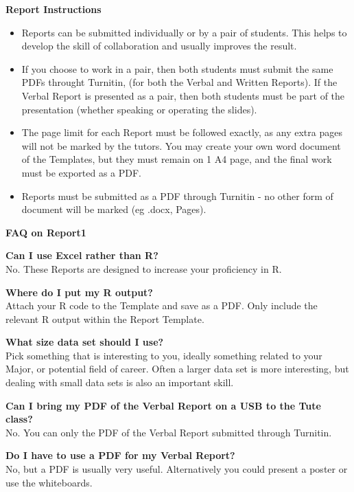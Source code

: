 \documentclass[bigtut]{quiz}\usepackage[]{graphicx}\usepackage[]{color}
\begin{document}
\begin{tutorial}
\vspace{.5cm}
{\bf Report Instructions}
\begin{itemize}
\item Reports can be submitted individually or by a pair of students. This helps to develop the skill of collaboration and usually improves the result. \\
\item If you choose to work in a pair, then both students must submit the same PDFs throught Turnitin, (for both the Verbal and Written Reports). If the Verbal Report is presented as a pair, then both students must be part of the presentation (whether speaking or operating the slides).  \\
\item The page limit for each Report must be followed exactly, as any extra pages will not be marked by the tutors. You may create your own word document of the Templates, but they must remain on 1 A4 page, and the final work must be exported as a PDF.  \\
\item Reports must be submitted as a PDF through Turnitin - no other form of document will be marked (eg .docx, Pages).
\end{itemize}


 
{\bf FAQ on Report1} 

{\bf Can I use Excel rather than R?} \\
No. These Reports are designed to increase your proficiency in R. 

{\bf Where do I put my R output?} \\
Attach your R code to the Template and save as a PDF. Only include the relevant R output within the Report Template.

{\bf What size data set should I use?} \\
Pick something that is interesting to you, ideally something related to your Major, or potential field of career.  Often a larger data set is more interesting, but dealing with small data sets is also an important skill. 

{\bf Can I bring my PDF of the Verbal Report on a USB to the Tute class?} \\
No. You can only the PDF of the Verbal Report submitted through Turnitin.

{\bf Do I have to use a PDF for my Verbal Report?} \\
No, but a PDF is usually very useful. Alternatively you could present a poster or use the whiteboards.


\end{tutorial}
\end{document}
